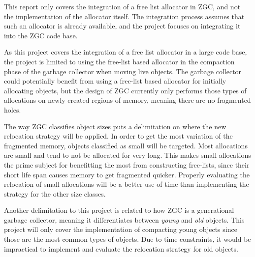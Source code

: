 This report only covers the integration of a free list allocator in ZGC, and not the implementation of the allocator itself. The integration process assumes that such an allocator is already available, and the project focuses on integrating it into the ZGC code base.

As this project covers the integration of a free list allocator in a large code base, the project is limited to using the free-list based allocator in the compaction phase of the garbage collector when moving live objects. The garbage collector could potentially benefit from using a free-list based allocator for initially allocating objects, but the design of ZGC currently only performs those types of allocations on newly created regions of memory, meaning there are no fragmented holes.

The way ZGC classifies object sizes puts a delimitation on where the new relocation strategy will be applied. In order to get the most variation of the fragmented memory, objects classified as small will be targeted. Most allocations are small and tend to not be allocated for very long. This makes small allocations the prime subject for benefitting the most from constructing free-lists, since their short life span causes memory to get fragmented quicker. Properly evaluating the relocation of small allocations will be a better use of time than implementing the strategy for the other size classes.

Another delimitation to this project is related to how ZGC is a generational garbage collector, meaning it differentiates between \textit{young} and \textit{old} objects. This project will only cover the implementation of compacting young objects since those are the most common types of objects. Due to time constraints, it would be impractical to implement and evaluate the relocation strategy for old objects.